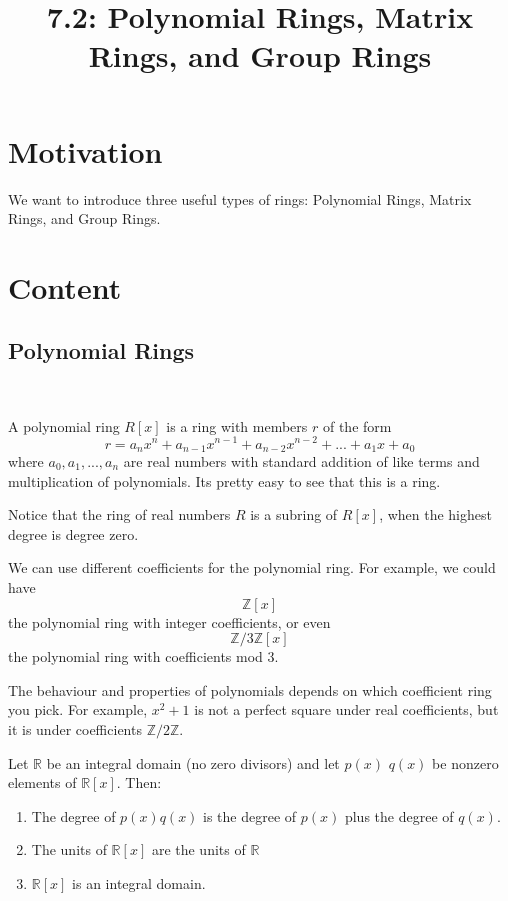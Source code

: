 \documentclass{article}
\title{7.2: Polynomial Rings, Matrix Rings, and Group Rings}
\begin{document}
\maketitle

\section{Motivation}
We want to introduce three useful types of rings: Polynomial Rings, Matrix Rings, and Group Rings.

\section{Content}
\subsection{Polynomial Rings}
\ 

\begin{definition}
A polynomial ring $R[x]$ is a ring with members $r$ of the form $$r = a_nx^n + a_{n-1}x^{n-1} + a_{n-2}x^{n-2} + ... + a_1x + a_0$$where $a_0, a_1, ... ,a_n$ are real numbers with standard addition of like terms and multiplication of polynomials. Its pretty easy to see that this is a ring. 

Notice that the ring of real numbers $R$ is a subring of $R[x]$, when the highest degree is degree zero. 
\end{definition}

We can use different coefficients for the polynomial ring. For example, we could have $$\mathbb{Z}[x]$$the polynomial ring with integer coefficients, or even $$\mathbb{Z}/3\mathbb{Z}[x]$$the polynomial ring with coefficients mod 3.

The behaviour and properties of polynomials depends on which coefficient ring you pick. For example, $x^2+1$ is not a perfect square under real coefficients, but it is under coefficients $\mathbb{Z}/2\mathbb{Z}$.

\begin{proposition}
Let $\mathbb{R}$ be an integral domain (no zero divisors) and let $p(x)$ $q(x)$ be nonzero elements of $\mathbb{R}[x]$. Then:

\begin{enumerate}
    \item The degree of $p(x)q(x)$ is the degree of $p(x)$ plus the degree of $q(x)$.
    \item The units of $\mathbb{R}[x]$ are the units of $\mathbb{R}$
    \item $\mathbb{R}[x]$ is an integral domain. 
\end{enumerate}
\end{proposition}
\end{document}
